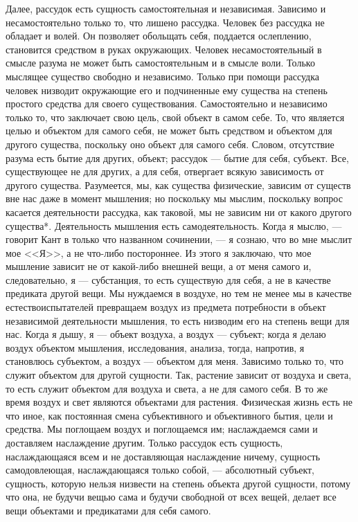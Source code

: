 \documentclass[12pt,oneside]{book}
\begin{document}
Далее, рассудок есть сущность самостоятельная и независимая. Зависимо и несамостоятельно только то, что лишено рассудка. Человек без рассудка не обладает и волей. Он позволяет обольщать себя, поддается ослеплению, становится средством в руках окружающих. Человек несамостоятельный в смысле разума не может быть самостоятельным и в смысле воли. Только мыслящее существо свободно и независимо. Только при помощи рассудка человек низводит окружающие его и подчиненные ему существа на степень простого средства для своего существования. Самостоятельно и независимо только то, что заключает свою цель, свой объект в самом себе. То, что является целью и объектом для самого себя, не может быть средством и объектом для другого существа, поскольку оно объект для самого себя. Словом, отсутствие разума есть бытие для других, объект; рассудок --- бытие для себя, субъект. Все, существующее не для других, а для себя, отвергает всякую зависимость от другого существа. Разумеется, мы, как существа физические, зависим от существ вне нас даже в момент мышления; но поскольку мы мыслим, поскольку вопрос касается деятельности рассудка, как таковой, мы не зависим ни от какого другого существа*\let\svthefootnote\thefootnote\let\thefootnote\relax{}\let\thefootnote\svthefootnote. Деятельность мышления есть самодеятельность. Когда я мыслю, --- говорит Кант в только что названном сочинении, --- я сознаю, что во мне мыслит мое <<Я>>, а не что-либо постороннее. Из этого я заключаю, что мое мышление зависит не от какой-либо внешней вещи, а от меня самого и, следовательно, я --- субстанция, то есть существую для себя, а не в качестве предиката другой вещи. Мы нуждаемся в воздухе, но тем не менее мы в качестве естествоиспытателей превращаем воздух из предмета потребности в объект независимой деятельности мышления, то есть низводим его на степень вещи для нас. Когда я дышу, я --- объект воздуха, а воздух --- субъект; когда я делаю воздух объектом мышления, исследования, анализа, тогда, напротив, я становлюсь субъектом, а воздух --- объектом для меня. Зависимо только то, что служит объектом для другой сущности. Так, растение зависит от воздуха и света, то есть служит объектом для воздуха и света, а не для самого себя. В то же время воздух и свет являются объектами для растения. Физическая жизнь есть не что иное, как постоянная смена субъективного и объективного бытия, цели и средства. Мы поглощаем воздух и поглощаемся им; наслаждаемся сами и доставляем наслаждение другим. Только рассудок есть сущность, наслаждающаяся всем и не доставляющая наслаждение ничему, сущность самодовлеющая, наслаждающаяся только собой, --- абсолютный субъект, сущность, которую нельзя низвести на степень объекта другой сущности, потому что она, не будучи вещью сама и будучи свободной от всех вещей, делает все вещи объектами и предикатами для себя самого.
\end{document}
